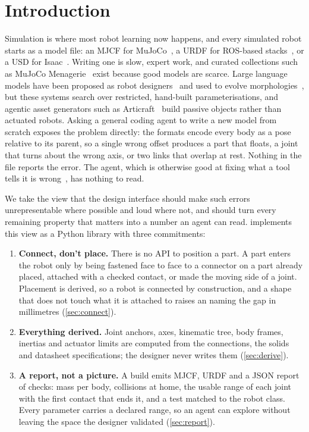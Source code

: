 \section{Introduction}
\label{sec:intro}

Simulation is where most robot learning now happens, and every simulated robot starts as a model
file: an MJCF for MuJoCo~\citep{todorov2012mujoco}, a URDF for ROS-based
stacks~\citep{quigley2009ros}, or a USD for Isaac~\citep{makoviychuk2021isaac}. Writing one is
slow, expert work, and curated collections such as MuJoCo Menagerie~\citep{zakka2022menagerie}
exist because good models are scarce. Large language models have been proposed as robot
designers~\citep{stella2023llmdesign} and used to evolve
morphologies~\citep{ringel2025text2robot,qiu2026robomorph}, but these systems search over
restricted, hand-built parameterisations, and agentic asset generators such as
Articraft~\citep{zhou2026articraft} build passive objects rather than actuated robots. Asking a general coding agent to write a new model from
scratch exposes the problem directly: the formats encode every body as a pose relative to its
parent, so a single wrong offset produces a part that floats, a joint that turns about the wrong
axis, or two links that overlap at rest. Nothing in the file reports the error. The agent, which
is otherwise good at fixing what a tool tells it is wrong~\citep{shinn2023reflexion,madaan2023selfrefine,jimenez2024swebench},
has nothing to read.

We take the view that the design interface should make such errors unrepresentable where possible
and loud where not, and should turn every remaining property that matters into a number an agent
can read. \ms implements this view as a Python library with three commitments:

\begin{enumerate}
\item \textbf{Connect, don't place.} There is no API to position a part. A part enters the robot
  only by being fastened face to face to a connector on a part already placed, attached with a
  checked contact, or made the moving side of a joint. Placement is derived, so a robot is
  connected by construction, and a shape that does not touch what it is attached to raises an
   naming the gap in millimetres (\cref{sec:connect}).
\item \textbf{Everything derived.} Joint anchors, axes, kinematic tree, body frames, inertias and
  actuator limits are computed from the connections, the solids and datasheet specifications; the
  designer never writes them (\cref{sec:derive}).
\item \textbf{A report, not a picture.} A build emits MJCF, URDF and a JSON report of checks: mass
  per body, collisions at home, the usable range of each joint with the first contact that ends
  it, and a test matched to the robot class. Every parameter carries a declared range, so an agent
  can explore without leaving the space the designer validated (\cref{sec:report}).
\end{enumerate}

